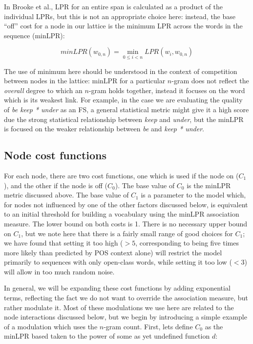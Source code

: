 \documentclass[11pt]{article}
\makeatletter
\def \al {al.\@ }
\makeatother
\begin{document}
In Brooke et \al {}, LPR for an entire span is calculated as a product of the individual LPRs, but this is not an appropriate choice here: instead, the base ``off'' cost for a node in our lattice is the minimum LPR across the words in the sequence (minLPR):

\begin{displaymath}
minLPR(w_{0,n}) = \min_{0 \leq i < n }{LPR(w_i,w_{0,n})}
\end{displaymath}

The use of minimum here should be understood in the context of competition between nodes in the lattice: minLPR for a particular $n$-gram does not reflect the \emph{overall}
degree to which an $n$-gram holds together, instead it focuses on the word which is its weakest link. For example, in the case we are evaluating the quality of \emph{be keep * under} as an FS, a general statistical metric might give it a high score due the strong statistical relationship between \emph{keep} and \emph{under}, but the minLPR is focused on the weaker relationship between \emph{be} and \emph{keep * under}.


\subsection{Node cost functions}

For each node, there are two cost functions, one which is used if the node on ($C_{1}$), and the other if the node is off ($C_{0}$). The base value of $C_{0}$ is the minLPR metric discussed above. The base value of $C_{1}$ is a parameter to the model which, for nodes not influenced by one of the other factors discussed below, is equivalent to an initial threshold for building a vocabulary using the minLPR association measure. The lower bound on both costs is 1. There is no necessary upper bound on $C_{1}$, but we note here that there is a fairly small range of good choices for $C_{1}$; we have found that setting it too high ($>5$, corresponding to being five times more likely than predicted by POS context alone) will restrict the model primarily to sequences with only open-class words, while setting it too low ($<3$) will allow in too much random noise.

In general, we will be expanding these cost functions by adding exponential terms, reflecting the fact we do not want to override the association measure, but rather modulate it. Most of these modulations we use here are related to the node interactions discussed below, but we begin by introducing a simple example of a modulation which uses the $n$-gram count. First, lets define $C_0$ as the minLPR based taken to the power of some as yet undefined function $d$:
\end{document}
